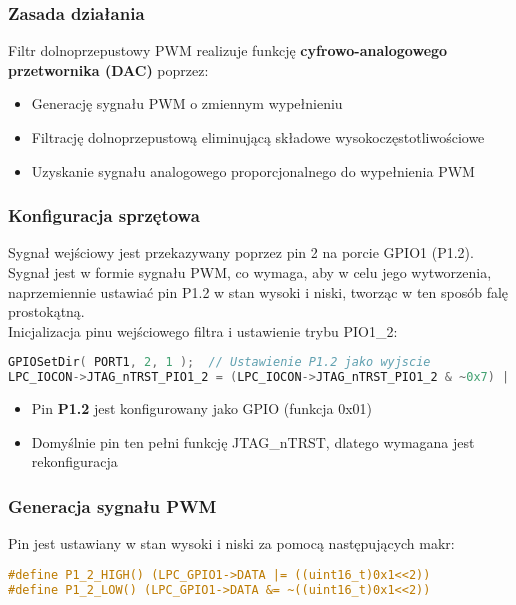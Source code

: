 \documentclass[letterpaper,11pt]{report}
\begin{document}
\subsubsection{Zasada działania}

Filtr dolnoprzepustowy PWM realizuje funkcję \textbf{cyfrowo-analogowego przetwornika (DAC)} poprzez:
\begin{itemize}
    \item Generację sygnału PWM o zmiennym wypełnieniu
    \item Filtrację dolnoprzepustową eliminującą składowe wysokoczęstotliwościowe
    \item Uzyskanie sygnału analogowego proporcjonalnego do wypełnienia PWM
\end{itemize}

\subsubsection{Konfiguracja sprzętowa}

Sygnał wejściowy jest przekazywany poprzez pin 2 na porcie GPIO1 (P1.2). Sygnał jest w formie sygnału PWM, co wymaga, aby w celu jego wytworzenia, naprzemiennie ustawiać pin P1.2 w stan wysoki i niski, tworząc w ten sposób falę prostokątną.\\

Inicjalizacja pinu wejściowego filtra i ustawienie trybu PIO1\_2:
\begin{lstlisting}[language=C]
GPIOSetDir( PORT1, 2, 1 );  // Ustawienie P1.2 jako wyjscie
LPC_IOCON->JTAG_nTRST_PIO1_2 = (LPC_IOCON->JTAG_nTRST_PIO1_2 & ~0x7) | 0x01;
\end{lstlisting}

\begin{itemize}
    \item Pin \textbf{P1.2} jest konfigurowany jako GPIO (funkcja 0x01)
    \item Domyślnie pin ten pełni funkcję JTAG\_nTRST, dlatego wymagana jest rekonfiguracja
\end{itemize}

\subsubsection{Generacja sygnału PWM}

\indent \indent Pin jest ustawiany w stan wysoki i niski za pomocą następujących makr:
\begin{lstlisting}[language=C]
#define P1_2_HIGH() (LPC_GPIO1->DATA |= ((uint16_t)0x1<<2))
#define P1_2_LOW() (LPC_GPIO1->DATA &= ~((uint16_t)0x1<<2))
\end{lstlisting}
\end{document}
